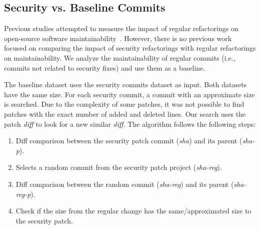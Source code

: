 \documentclass[sigconf,review]{acmart}
\begin{document}
%
\subsection{Security vs. Baseline Commits}
%
Previous studies attempted to measure the impact of regular refactorings on
open-source software maintainability~\cite{HEGEDUS2018313}. However, there is no
previous work focused on comparing the impact of security refactorings with
regular refactorings on maintainability.
We analyze the maintainability of regular commits (i.e., commits not related
to security fixes) and use them as a baseline.

The baseline dataset uses the security commits dataset as input.
Both datasets have the same size. For each
security commit, a commit with an approximate size is searched. Due to the complexity 
of some patches, it was not possible to find patches with the exact number of added and 
deleted lines. Our search uses the patch \emph{diff} to look for a new similar \emph{diff}. The algorithm follows the following steps:

\begin{enumerate}
\item Diff comparison between the security patch commit (\emph{sha}) and its parent (\emph{sha-p}).
\item Selects a random commit from the security patch project (\emph{sha-reg}).
\item Diff comparison between the random commit (\emph{sha-reg}) and its parent (\emph{sha-reg-p}).
\item Check if the size from the regular change has the same/approximated size to 
the security patch.
\end{enumerate}
\end{document}
